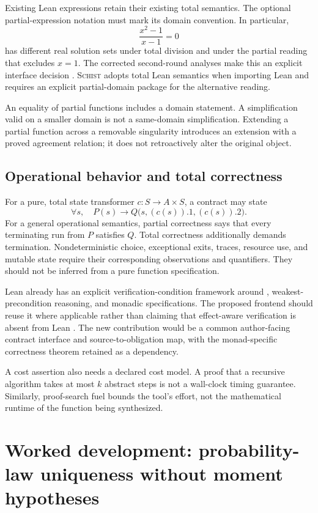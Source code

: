 \documentclass[11pt,a4paper]{article}
\newcommand{\code}[1]{\texttt{\detokenize{#1}}}
\newcommand{\Schist}{\textsc{Schist}}
\theoremstyle{definition}
\begin{document}
Existing Lean expressions retain their existing total semantics. The optional
partial-expression notation must mark its domain convention. In particular,
\[
 \frac{x^2-1}{x-1}=0
\]
has different real solution sets under total division and under the partial
reading that excludes $x=1$. The corrected second-round analyses make this an
explicit interface decision \cite{round2a,round2b}. \Schist{} adopts total Lean
semantics when importing Lean and requires an explicit partial-domain package
for the alternative reading.

An equality of partial functions includes a domain statement. A simplification
valid on a smaller domain is not a same-domain simplification. Extending a
partial function across a removable singularity introduces an extension with a
proved agreement relation; it does not retroactively alter the original object.

\subsection{Operational behavior and total correctness}
For a pure, total state transformer $c:S\to A\times S$, a contract may state
\[
 \forall s,\quad P(s)\to Q\bigl(s,(c(s)).1,(c(s)).2\bigr).
\]
For a general operational semantics, partial correctness says that every
terminating run from $P$ satisfies $Q$. Total correctness additionally demands
termination. Nondeterministic choice, exceptional exits, traces, resource use,
and mutable state require their corresponding observations and quantifiers.
They should not be inferred from a pure function specification.

Lean already has an explicit verification-condition framework around
\code{mvcgen}, weakest-precondition reasoning, and monadic specifications.
The proposed frontend should reuse it where applicable rather than claiming
that effect-aware verification is absent from Lean \cite{mvcgen,mvcgenpred}.
The new contribution would be a common author-facing contract interface and
source-to-obligation map, with the monad-specific correctness theorem retained
as a dependency.

A cost assertion also needs a declared cost model. A proof that a recursive
algorithm takes at most $k$ abstract steps is not a wall-clock timing guarantee.
Similarly, proof-search fuel bounds the tool's effort, not the mathematical
runtime of the function being synthesized.

\section{Worked development: probability-law uniqueness without moment hypotheses}\label{sec:probability}
\end{document}
